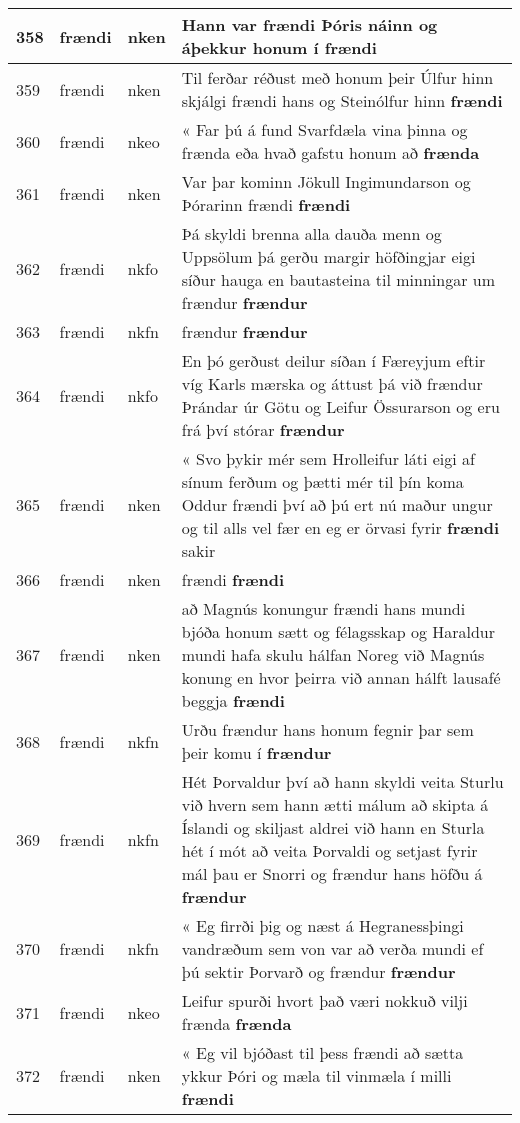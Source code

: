 \documentclass{article}
\begin{document}
\begin{longtable}{p{1cm}|p{1cm}|p{1cm}|p{13cm}}
\hline
358&frændi&nken&Hann var frændi Þóris náinn og áþekkur honum í \textbf{frændi} \\
\hline
359&frændi&nken&Til ferðar réðust með honum þeir Úlfur hinn skjálgi frændi hans og Steinólfur hinn \textbf{frændi} \\
\hline
360&frændi&nkeo&« Far þú á fund Svarfdæla vina þinna og frænda eða hvað gafstu honum að \textbf{frænda} \\
\hline
361&frændi&nken&Var þar kominn Jökull Ingimundarson og Þórarinn frændi \textbf{frændi} \\
\hline
362&frændi&nkfo&Þá skyldi brenna alla dauða menn og Uppsölum þá gerðu margir höfðingjar eigi síður hauga en bautasteina til minningar um frændur \textbf{frændur} \\
\hline
363&frændi&nkfn&frændur \textbf{frændur} \\
\hline
364&frændi&nkfo&En þó gerðust deilur síðan í Færeyjum eftir víg Karls mærska og áttust þá við frændur Þrándar úr Götu og Leifur Össurarson og eru frá því stórar \textbf{frændur} \\
\hline
365&frændi&nken&« Svo þykir mér sem Hrolleifur láti eigi af sínum ferðum og þætti mér til þín koma Oddur frændi því að þú ert nú maður ungur og til alls vel fær en eg er örvasi fyrir \textbf{frændi} sakir\\
\hline
366&frændi&nken&frændi \textbf{frændi} \\
\hline
367&frændi&nken&að Magnús konungur frændi hans mundi bjóða honum sætt og félagsskap og Haraldur mundi hafa skulu hálfan Noreg við Magnús konung en hvor þeirra við annan hálft lausafé beggja \textbf{frændi} \\
\hline
368&frændi&nkfn&Urðu frændur hans honum fegnir þar sem þeir komu í \textbf{frændur} \\
\hline
369&frændi&nkfn&Hét Þorvaldur því að hann skyldi veita Sturlu við hvern sem hann ætti málum að skipta á Íslandi og skiljast aldrei við hann en Sturla hét í mót að veita Þorvaldi og setjast fyrir mál þau er Snorri og frændur hans höfðu á \textbf{frændur} \\
\hline
370&frændi&nkfn&« Eg firrði þig og næst á Hegranessþingi vandræðum sem von var að verða mundi ef þú sektir Þorvarð og frændur \textbf{frændur} \\
\hline
371&frændi&nkeo&Leifur spurði hvort það væri nokkuð vilji frænda \textbf{frænda} \\
\hline
372&frændi&nken&« Eg vil bjóðast til þess frændi að sætta ykkur Þóri og mæla til vinmæla í milli \textbf{frændi} \\

\end{longtable}
\end{document}
